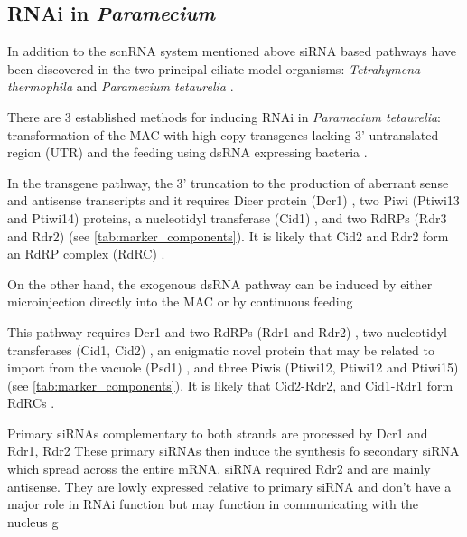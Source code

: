 \subsection{RNAi in \textit{Paramecium}}

In addition to the scnRNA system mentioned above siRNA
based pathways have been discovered in the two principal
ciliate model organisms: \textit{Tetrahymena thermophila} \citep{Collins2006,Yao2005}
and \textit{Paramecium tetaurelia} \citep{Galvani2001,Galvani2002}. 


There are 3 established methods for inducing RNAi in \textit{Paramecium tetaurelia}:
transformation of the MAC with high-copy transgenes lacking 3' untranslated
region (UTR) \citep{Galvani2001} and the feeding using dsRNA expressing
bacteria \citep{Galvani2002}.

In the transgene pathway, the 3' truncation to the production of aberrant
sense and antisense transcripts \citep{Galvani2001,Marker2010} and 
it requires Dicer protein (Dcr1) \citep{Lepere2009}, two Piwi 
(Ptiwi13 and Ptiwi14) \citep{Bouhouche2011} proteins, a nucleotidyl transferase 
(Cid1) \citep{Marker2014},
and two RdRPs (Rdr3 and Rdr2) \citep{Marker2010,Marker2014} (see \cref{tab:marker_components}).
It is likely that Cid2 and Rdr2 form an RdRP complex (RdRC) \citep{Marker2014}.




On the other hand, the exogenous dsRNA pathway can be induced by either microinjection directly
into the MAC or by continuous feeding 

This pathway requires Dcr1 \citep{Lepere2009} and two RdRPs (Rdr1 and Rdr2) \citep{Marker2010,Marker2014},
two nucleotidyl transferases (Cid1, Cid2) \citep{Marker2014}, an enigmatic 
novel protein that may be related to import from the vacuole (Psd1) \citep{Marker2014,Carradec2015}, and three
Piwis (Ptiwi12, Ptiwi12 and Ptiwi15) \citep{Bouhouche2011,Marker2014} (see \cref{tab:marker_components}).
It is likely that Cid2-Rdr2, and Cid1-Rdr1 form RdRCs \citep{Marker2014}.


Primary siRNAs complementary to both strands are processed by Dcr1 and Rdr1, Rdr2
These primary siRNAs then induce the synthesis fo secondary siRNA
which spread across the entire mRNA.
siRNA required Rdr2 and are mainly antisense. 
They are lowly expressed relative to primary siRNA and don't have a major role in
RNAi function but may function in communicating with the nucleus g\citep{Carradec2015}



